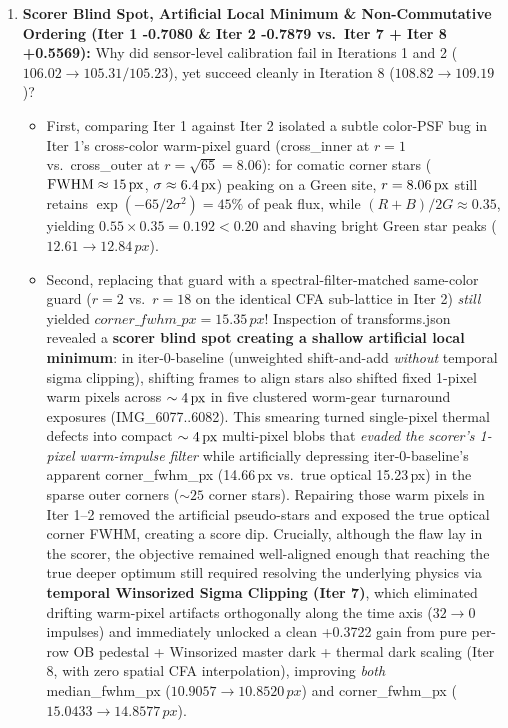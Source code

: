 \documentclass[10pt,twocolumn,letterpaper]{article}
\DeclareRobustCommand{\code}[1]{\texttt{#1}}
\def\code#1{#1}%
\begin{document}
\begin{enumerate}
  \item \textbf{Scorer Blind Spot, Artificial Local Minimum \& Non-Commutative Ordering (\code{Iter 1} \code{-0.7080} \& \code{Iter 2} \code{-0.7879} vs.\ \code{Iter 7 + Iter 8} \code{+0.5569}):}
  Why did sensor-level calibration fail in Iterations 1 and 2 ($\code{106.02} \to \code{105.31} / \code{105.23}$), yet succeed cleanly in Iteration 8 ($\code{108.82} \to \code{109.19}$)?
  \begin{itemize}
    \item First, comparing \code{Iter 1} against \code{Iter 2} isolated a subtle color-PSF bug in \code{Iter 1}'s cross-color warm-pixel guard (\code{cross\_inner} at $r=1$ vs.\ \code{cross\_outer} at $r=\sqrt{65}=8.06$): for comatic corner stars ($\text{FWHM} \approx 15\text{\,px}$, $\sigma \approx 6.4\text{\,px}$) peaking on a Green site, $r = 8.06\text{\,px}$ still retains $\exp(-65 / 2\sigma^2) = 45\%$ of peak flux, while $(R+B)/2G \approx 0.35$, yielding $0.55 \times 0.35 = 0.192 < 0.20$ and shaving bright Green star peaks ($\code{12.61} \to \code{12.84\,px}$).
    \item Second, replacing that guard with a spectral-filter-matched same-color guard ($r=2$ vs.\ $r=18$ on the identical CFA sub-lattice in \code{Iter 2}) \emph{still} yielded $\code{corner\_fwhm\_px} = \code{15.35\,px}$! Inspection of \code{transforms.json} revealed a \textbf{scorer blind spot creating a shallow artificial local minimum}: in \code{iter-0-baseline} (unweighted shift-and-add \emph{without} temporal sigma clipping), shifting frames to align stars also shifted fixed 1-pixel warm pixels across $\sim 4\text{\,px}$ in five clustered worm-gear turnaround exposures (\code{IMG\_6077..6082}). This smearing turned single-pixel thermal defects into compact $\sim 4\text{\,px}$ multi-pixel blobs that \emph{evaded the scorer's 1-pixel warm-impulse filter} while artificially depressing \code{iter-0-baseline}'s apparent \code{corner\_fwhm\_px} (\code{14.66\,px} vs.\ true optical \code{15.23\,px}) in the sparse outer corners ($\sim 25$ corner stars). Repairing those warm pixels in \code{Iter 1--2} removed the artificial pseudo-stars and exposed the true optical corner FWHM, creating a score dip. Crucially, although the flaw lay in the scorer, the objective remained well-aligned enough that reaching the true deeper optimum still required resolving the underlying physics via \textbf{temporal Winsorized Sigma Clipping (\code{Iter 7})}, which eliminated drifting warm-pixel artifacts orthogonally along the time axis ($\code{32} \to \code{0}$ impulses) and immediately unlocked a clean \code{+0.3722} gain from pure per-row OB pedestal + Winsorized master dark + thermal dark scaling (\code{Iter 8}, with zero spatial CFA interpolation), improving \emph{both} \code{median\_fwhm\_px} ($\code{10.9057} \to \code{10.8520\,px}$) and \code{corner\_fwhm\_px} ($\code{15.0433} \to \code{14.8577\,px}$).
  \end{itemize}


\end{enumerate}
\end{document}

